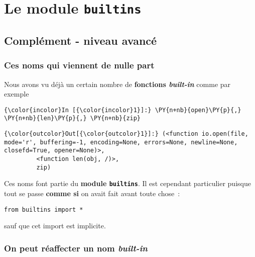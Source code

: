     
    
    
    

    

    \hypertarget{le-module-builtins}{%
\section{\texorpdfstring{Le module
\texttt{builtins}}{Le module builtins}}\label{le-module-builtins}}

    \hypertarget{compluxe9ment---niveau-avancuxe9}{%
\subsection{Complément - niveau
avancé}\label{compluxe9ment---niveau-avancuxe9}}

    \hypertarget{ces-noms-qui-viennent-de-nulle-part}{%
\subsubsection{Ces noms qui viennent de nulle
part}\label{ces-noms-qui-viennent-de-nulle-part}}

    Nous avons vu déjà un certain nombre de \textbf{fonctions
\emph{built-in}} comme par exemple

    \begin{Verbatim}[commandchars=\\\{\}]
{\color{incolor}In [{\color{incolor}1}]:} \PY{n+nb}{open}\PY{p}{,} \PY{n+nb}{len}\PY{p}{,} \PY{n+nb}{zip}
\end{Verbatim}


\begin{Verbatim}[commandchars=\\\{\}]
{\color{outcolor}Out[{\color{outcolor}1}]:} (<function io.open(file, mode='r', buffering=-1, encoding=None, errors=None, newline=None, closefd=True, opener=None)>,
         <function len(obj, /)>,
         zip)
\end{Verbatim}
            
    Ces noms font partie du \textbf{module \texttt{builtins}}. Il est
cependant particulier puisque tout se passe \textbf{comme si} on avait
fait avant toute chose~:

\begin{verbatim}
from builtins import *
\end{verbatim}

sauf que cet import est implicite.

    \hypertarget{on-peut-ruxe9affecter-un-nom-built-in}{%
\subsubsection{\texorpdfstring{On peut réaffecter un nom
\emph{built-in}}{On peut réaffecter un nom built-in}}\label{on-peut-ruxe9affecter-un-nom-built-in}}

